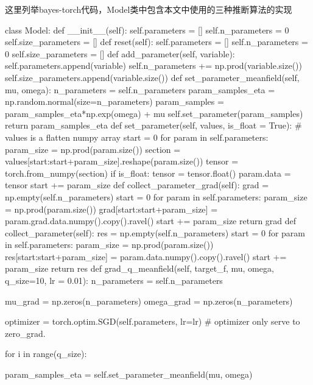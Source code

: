 \documentclass{sicnuthesis}
\begin{document}
这里列举bayes-torch代码，Model类中包含本文中使用的三种推断算法的实现

\begin{python}

class Model:
    def __init__(self):
        self.parameters = []
        self.n_parameters = 0
        self.size_parameters = []
    def reset(self):
        self.parameters = []
        self.n_parameters = 0
        self.size_parameters = []
    def add_parameter(self, variable):
        self.parameters.append(variable)
        self.n_parameters += np.prod(variable.size())
        self.size_parameters.append(variable.size())
    def set_parameter_meanfield(self, mu, omega):
        n_parameters = self.n_parameters
        param_samples_eta = np.random.normal(size=n_parameters)
        param_samples = param_samples_eta*np.exp(omega) + mu
        self.set_parameter(param_samples)
        return param_samples_eta
    def set_parameter(self, values, is_float = True):
        # values is a flatten numpy array
        start = 0
        for param in self.parameters:
            param_size = np.prod(param.size())
            section = values[start:start+param_size].reshape(param.size())
            tensor = torch.from_numpy(section)
            if is_float:
                tensor = tensor.float()
            param.data = tensor
            start += param_size
    def collect_parameter_grad(self):
        grad = np.empty(self.n_parameters)
        start = 0
        for param in self.parameters:
            param_size = np.prod(param.size())
            grad[start:start+param_size] = param.grad.data.numpy().copy().ravel()
            start += param_size
        return grad
    def collect_parameter(self):
        res = np.empty(self.n_parameters)
        start = 0
        for param in self.parameters:
            param_size = np.prod(param.size())
            res[start:start+param_size] = param.data.numpy().copy().ravel()
            start += param_size
        return res
    def grad_q_meanfield(self, target_f, mu, omega, q_size=10, lr = 0.01):
        n_parameters = self.n_parameters
        
        mu_grad = np.zeros(n_parameters)
        omega_grad = np.zeros(n_parameters)
        
        optimizer = torch.optim.SGD(self.parameters, lr=lr)
        # optimizer only serve to zero_grad.
        
        for i in range(q_size):
            
            param_samples_eta = self.set_parameter_meanfield(mu, omega)
            

\end{python}
\end{document}
